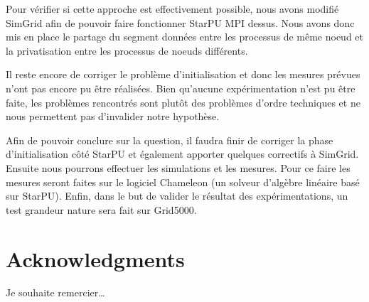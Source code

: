 \documentclass[smallextended]{svjour3}
\begin{document}
Pour vérifier si cette approche est effectivement possible, nous
avons modifié SimGrid afin de pouvoir faire fonctionner StarPU MPI
dessus. Nous avons donc mis en place le partage du segment données
entre les processus de même noeud et la privatisation entre les
processus de noeuds différents. 

Il reste encore de corriger le problème d'initialisation et donc les
mesures prévues n'ont pas encore pu être réalisées. Bien qu'aucune
expérimentation n'est pu être faite, les problèmes rencontrés sont
plutôt des problèmes d'ordre techniques et ne nous permettent pas
d'invalider notre hypothèse. 

Afin de pouvoir conclure sur la question, il faudra finir de
corriger la phase d'initialisation côté StarPU et également apporter
quelques correctifs à SimGrid. Ensuite nous pourrons effectuer les
simulations et les mesures. Pour ce faire les mesures seront faites
sur le logiciel Chameleon (un solveur d'algèbre linéaire basé sur
StarPU). Enfin, dans le but de valider le résultat des
expérimentations, un test grandeur nature sera fait sur Grid5000.

\section*{Acknowledgments}
Je souhaite remercier\ldots{}

\nocite{*}
\def\raggedright{}


\end{document}
